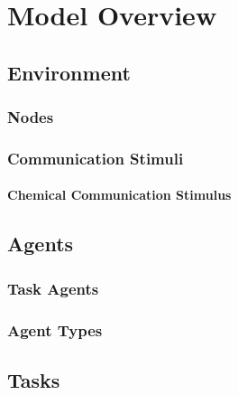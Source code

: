 \chapter{Model Overview}
\label{ch:model-overview}

\section{Environment}
\subsection{Nodes}
\subsection {Communication Stimuli}
\subsubsection{Chemical Communication Stimulus}
\section {Agents}
\subsection{Task Agents}
\subsection{Agent Types}

\section {Tasks}
